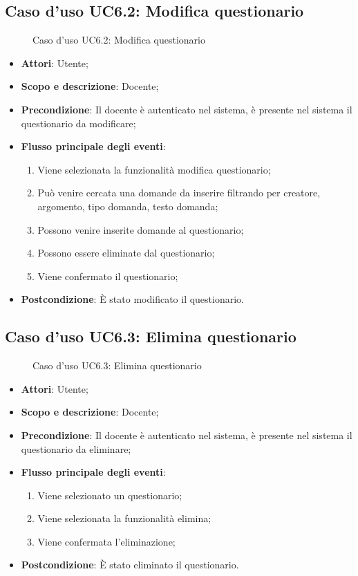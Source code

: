 \documentclass[12pt,a4paper]{article}
\begin{document}
\subsection{Caso d'uso UC6.2: Modifica questionario}
\begin{figure}[H]
	\centering

	\caption{Caso d'uso UC6.2: Modifica questionario}\label{fig:UC6.2} 
\end{figure}\begin{itemize}
\item \textbf{Attori}: Utente;
\item \textbf{Scopo e descrizione}: Docente; 
\item \textbf{Precondizione}: Il docente è autenticato nel sistema, è presente nel sistema il questionario da modificare;

\item \textbf{Flusso principale degli eventi}:
\begin{enumerate}
	\item Viene selezionata la funzionalità modifica questionario;
	\item Può venire cercata una domande da inserire filtrando per creatore, argomento, tipo domanda, testo domanda;
	\item Possono venire inserite domande al questionario;
	\item Possono essere eliminate dal questionario;
	\item Viene confermato il questionario;
	
\end{enumerate}
\item \textbf{Postcondizione}: È stato modificato il questionario.
\end{itemize}
\hypertarget{UC6.3}{}
\subsection{Caso d'uso UC6.3: Elimina questionario}
\begin{figure}[H]
	\centering

	\caption{Caso d'uso UC6.3: Elimina questionario}\label{fig:UC6.3} 
\end{figure}\begin{itemize}
\item \textbf{Attori}: Utente;
\item \textbf{Scopo e descrizione}: Docente; 
\item \textbf{Precondizione}: Il docente è autenticato nel sistema, è presente nel sistema il questionario da eliminare;

\item \textbf{Flusso principale degli eventi}:
\begin{enumerate}
	\item Viene selezionato un questionario;
	\item Viene selezionata la funzionalità elimina;
	\item Viene confermata l'eliminazione;
	
\end{enumerate}
\item \textbf{Postcondizione}: È stato eliminato il questionario.
\end{itemize}
\hypertarget{UC7}{}
\end{document}
